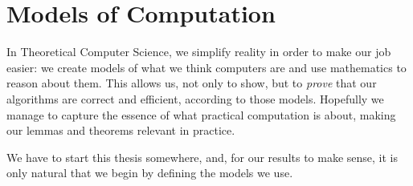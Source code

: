 \chapter{\done Models of Computation}%
\label{chapter:models-of-computation}

In Theoretical Computer Science, we simplify reality in order to make our job
easier: we create models of what we think computers are and use mathematics to
reason about them.
%
This allows us, not only to show, but to \emph{prove} that our algorithms are
correct and efficient, according to those models.
%
Hopefully we manage to capture the essence of what practical computation is
about, making our lemmas and theorems relevant in practice.

We have to start this thesis somewhere, and,
for our results to make sense,
it is only natural that we begin by defining the models we
use.



